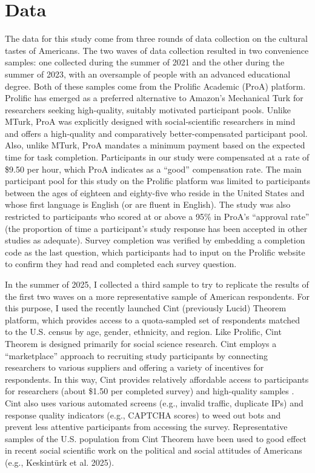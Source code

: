 \documentclass[12pt]{article}
\begin{document}
\section*{Data}
The data for this study come from three rounds of data collection on the cultural tastes of Americans. The two waves of data collection resulted in two convenience samples: one collected during the summer of 2021 and the other during the summer of 2023, with an oversample of people with an advanced educational degree. Both of these samples come from the Prolific Academic (ProA) platform. Prolific has emerged as a preferred alternative to Amazon’s Mechanical Turk for researchers seeking high-quality, suitably motivated participant pools. Unlike MTurk, ProA was explicitly designed with social-scientific researchers in mind and offers a high-quality and comparatively better-compensated participant pool. Also, unlike MTurk, ProA mandates a minimum payment based on the expected time for task completion. Participants in our study were compensated at a rate of \$9.50 per hour, which ProA indicates as a “good” compensation rate. The main participant pool for this study on the Prolific platform was limited to participants between the ages of eighteen and eighty-five who reside in the United States and whose first language is English (or are fluent in English). The study was also restricted to participants who scored at or above a 95\% in ProA’s ``approval rate'' (the proportion of time a participant’s study response has been accepted in other studies as adequate). Survey completion was verified by embedding a completion code as the last question, which participants had to input on the Prolific website to confirm they had read and completed each survey question.  

In the summer of 2025, I collected a third sample to try to replicate the results of the first two waves on a more representative sample of American respondents. For this purpose, I used the recently launched Cint (previously Lucid) Theorem platform, which provides access to a quota-sampled set of respondents matched to the U.S. census by age, gender, ethnicity, and region. Like Prolific, Cint Theorem is designed primarily for social science research. Cint employs a ``marketplace'' approach to recruiting study participants by connecting researchers to various suppliers and offering a variety of incentives for respondents. In this way, Cint provides relatively affordable access to participants for researchers (about \$1.50 per completed survey) and high-quality samples \citep{crabtree2025yes-e5f}. Cint also uses various automated screens (e.g., invalid traffic, duplicate IPs) and response quality indicators (e.g., CAPTCHA scores) to weed out bots and prevent less attentive participants from accessing the survey. Representative samples of the U.S. population from Cint Theorem have been used to good effect in recent social scientific work on the political and social attitudes of Americans (e.g., Keskintürk et al. 2025). 
\end{document}
